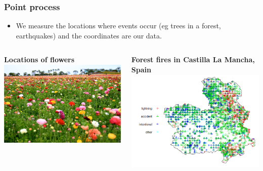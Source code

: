 \documentclass[parskip,12pt]{beamer}
\begin{document}
\begin{frame}
\frametitle{Point process}
 \begin{itemize}
\vspace{3mm}
\item We measure the locations where events occur (eg trees in a forest, earthquakes) and the coordinates are our data.
\end{itemize}
\begin{columns}
\begin{column}{0.5\textwidth}
    \begin{center}
    \textbf{Locations of flowers}
     \includegraphics[width=\textwidth]{Flowers}
          \end{center}
\end{column}
\begin{column}{0.5\textwidth}
    \begin{center}
    \textbf{Forest fires in Castilla La Mancha, Spain}
     \includegraphics[width=\textwidth]{Fires}
          \end{center}
\end{column}
\end{columns}
\end{frame}
\end{document}
